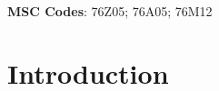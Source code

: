 \documentclass[lineno]{jfm}
\begin{document}
%

\noindent\textbf{MSC Codes}: 76Z05; 76A05; 76M12

\section{Introduction}
\label{sec:introduction}

\end{document}
